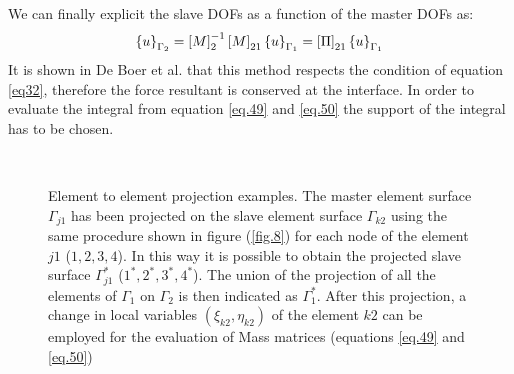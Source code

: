 We can finally explicit the slave DOFs as a function of the master DOFs as:
\begin{equation}
\label{eq.51}
\left\lbrace{u}\right \rbrace_{\Gamma_2}=\left[{M}\right]_2^{-1}\left[{M}\right]_{21}\left\lbrace{u}\right \rbrace_{\Gamma_1}=\left[{\Pi}\right]_{21}\left\lbrace{u}\right \rbrace_{\Gamma_1}
\end{equation}
It is shown in De Boer et al. \cite{de2007review}  that this method respects the condition of equation \eqref{eq32}, therefore the force resultant is conserved at the interface.
In order to evaluate the integral from equation \eqref{eq.49} and \eqref{eq.50} the support of the integral has to be chosen.

 \begin{figure}[!ht]
 \centering
      \\
 
  
  \caption{Element to element projection examples. The master element surface $\Gamma_{j1}$ has been projected on the slave element surface $\Gamma_{k2}$ using the same procedure shown in figure (\ref{fig.8}) for each node of the element $j1$ ($1,2,3,4$). In this way it is possible to obtain the projected slave surface $\Gamma_{j1}^*$ ($1^*,2^*,3^*,4^*$). The union of the projection of all the elements of $\Gamma_1$ on $\Gamma_2$ is then indicated as $\Gamma_1^*$. After this projection, a change in local variables $(\xi_{k2},\eta_{k2})$ of the element $k2$ can be employed for the evaluation of Mass matrices (equations \eqref{eq.49} and \eqref{eq.50})}
  \label{fig.9}
\end{figure}
